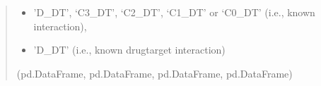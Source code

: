 \documentclass[letterpaper,10pt,english]{sphinxmanual}
\begin{document}
\begin{fulllineitems}
\begin{quote}
\begin{description}
\begin{itemize}
\begin{description}
\end{description}

\item {} \begin{description}
\sphinxAtStartPar
’D\_DT’, ‘C3\_DT’, ‘C2\_DT’, ‘C1\_DT’ or ‘C0\_DT’ (i.e., known interaction),

\end{description}

\item {} \begin{description}
\sphinxAtStartPar
’D\_DT’ (i.e., known drug\sphinxhyphen{}target interaction)

\end{description}

\end{itemize}


\sphinxAtStartPar
(pd.DataFrame, pd.DataFrame, pd.DataFrame, pd.DataFrame)

\end{description}\end{quote}

\end{fulllineitems}

\end{document}
